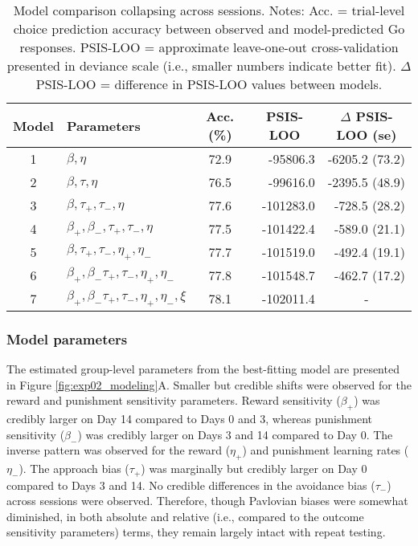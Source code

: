 \documentclass[a4paper,12pt]{article}
\begin{document}
\begin{refsection}[main]
\begin{table}[b!]
    \centering
    \begin{tabular}{clcrr}
        \toprule
        Model & Parameters & Acc. (\%) & \multicolumn{1}{c}{PSIS-LOO} & \multicolumn{1}{c}{$\Delta$ PSIS-LOO (se)} \\
        \midrule
        1 & $\beta, \eta$ & 72.9 & -95806.3 & -6205.2 (73.2) \\
        2 & $\beta, \tau, \eta$ & 76.5 & -99616.0 & -2395.5 (48.9) \\
        3 & $\beta, \tau_+, \tau_-, \eta$ & 77.6 & -101283.0 & -728.5 (28.2) \\
        4 & $\beta_+, \beta_-, \tau_+, \tau_-, \eta$ & 77.5 & -101422.4 & -589.0 (21.1) \\
        5 & $\beta, \tau_+, \tau_-, \eta_+, \eta_-$ & 77.7 & -101519.0 & -492.4 (19.1) \\
        6 & $\beta_+, \beta_- \tau_+, \tau_-, \eta_+, \eta_-$ & 77.8 & -101548.7 & -462.7 (17.2) \\
        7 & $\beta_+, \beta_- \tau_+, \tau_-, \eta_+, \eta_-, \xi$ & 78.1 & -102011.4 & \multicolumn{1}{c}{-} \\
        \bottomrule
\end{tabular}
    \caption{Model comparison collapsing across sessions. Notes: Acc. = trial-level choice prediction accuracy between observed and model-predicted Go responses. PSIS-LOO = approximate leave-one-out cross-validation presented in deviance scale (i.e., smaller numbers indicate better fit). \break $\Delta$ PSIS-LOO = difference in PSIS-LOO values between models.}
    \label{tab:exp2_mc_abbr}
\end{table}

\subsubsection*{Model parameters}

The estimated group-level parameters from the best-fitting model are presented in Figure \ref{fig:exp02_modeling}A. Smaller but credible shifts were observed for the reward and punishment sensitivity parameters. Reward sensitivity ($\beta_+$) was credibly larger on Day 14 compared to Days 0 and 3, whereas punishment sensitivity ($\beta_-$) was credibly larger on Days 3 and 14 compared to Day 0. The inverse pattern was observed for the reward ($\eta_+$) and punishment learning rates ($\eta_-$). The approach bias ($\tau_+$) was marginally but credibly larger on Day 0 compared to Days 3 and 14. No credible differences in the avoidance bias ($\tau_-$) across sessions were observed. Therefore, though Pavlovian biases were somewhat diminished, in both absolute and relative (i.e., compared to the outcome sensitivity parameters) terms, they remain largely intact with repeat testing.   


\end{refsection}
\end{document}
